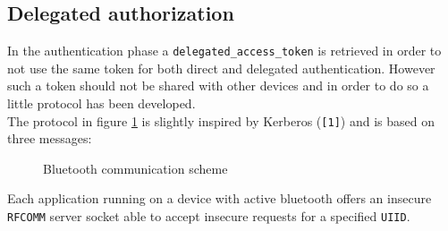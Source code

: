 \documentclass[conference, 11pt]{IEEEtran}
\begin{document}
\subsection{\textbf{Delegated authorization}}
In the authentication phase a \texttt{delegated\allowbreak\_access\allowbreak\_token} is retrieved in order to not use the same token for both direct and delegated authentication. However such a token should not be shared with other devices and in order to do so a little protocol has been developed.\\
The protocol in figure \ref{img:bluetooth} is slightly inspired by Kerberos (\texttt{[1]}) and is based on three messages:\\

\begin{figure}[!ht]
\begin{center}
\caption{Bluetooth communication scheme}
\label{img:bluetooth}
\end{center}
\end{figure}

Each application running on a device with active bluetooth offers an insecure \texttt{RFCOMM} server socket able to accept insecure requests for a specified \texttt{UIID}.\\
\end{document}
